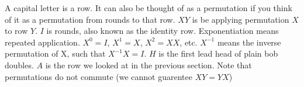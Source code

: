 \documentclass[preview]{standalone}
\begin{document}
\begin{flushleft}
A capital letter is a row. It can also be thought of as a permutation if you think of it as a permutation from rounds to that row. $XY$ is be applying permutation $X$ to row $Y$. $I$ is rounds, also known as the identity row. Exponentiation means repeated application. $X^0=I$, $X^1=X$, $X^2=XX$, etc. $X^{-1}$ means the inverse permutation of X, such that $X^{-1}X=I$. $H$ is the first lead head of plain bob doubles. $A$ is the row we looked at in the previous section. Note that permutations do not commute (we cannot guarentee $XY=YX$)
\end{flushleft}
\end{document}
